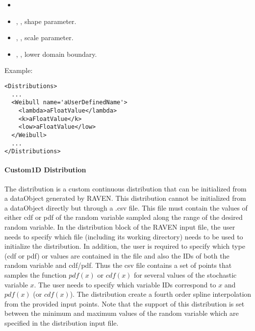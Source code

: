 %
\attrIntro
\vspace{-5mm}
\begin{itemize}
  \itemsep0em
  \item \nameDescription
\end{itemize}
\vspace{-5mm}
\subnodesIntro
\begin{itemize}
  \item {}, , shape parameter.
  \item {}, , scale parameter.
  \item {}, , lower domain
  boundary. 
\end{itemize}

Example:
\begin{lstlisting}[style=XML]
<Distributions>
  ...
  <Weibull name='aUserDefinedName'>
    <lambda>aFloatValue</lambda>
    <k>aFloatValue</k>
    <low>aFloatValue</low>
  </Weibull>
  ...
</Distributions>
\end{lstlisting}

\paragraph{Custom1D Distribution}
\label{Custom1D}
The  distribution is a custom continuous distribution that can be initialized from a dataObject
generated by RAVEN.
This distribution cannot be initialized from a dataObject directly but through a .csv file.
This file must contain the values of either cdf or pdf of the random variable sampled along the range of the desired 
random variable.
In the distribution block of the RAVEN input file, the user needs to specify which file (including its working directory)
needs to be used to initialize the distribution. In addition, the user is required to specify which type (cdf or pdf) or values
are contained in the file and also the IDs of both the random variable and cdf/pdf.
Thus the csv file contains a set of points that samples the function $pdf(x)$ or $cdf(x)$ for several values of the stochastic variable $x$. 
The user needs to specify which variable IDs correspond to $x$ and $pdf(x)$ (or $cdf(x)$).
The distribution create a fourth order spline interpolation from the provided input points.
%
Note that the support of this distribution is set between the minimum and maximum values of the random variable which are 
specified in the distribution input file.

